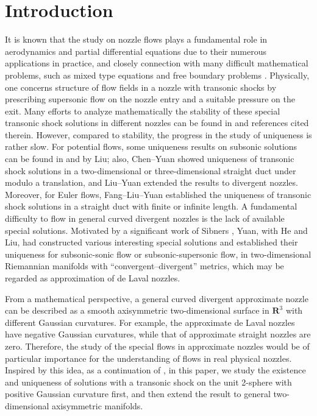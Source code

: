 \documentclass[10pt,a4paper]{amsart}
\numberwithin{equation}{section}
\begin{document}
\section{Introduction}\label{sec1}
It is known that the study on nozzle flows plays a fundamental role in aerodynamics and partial differential equations due to their numerous applications in practice, and closely connection with many difficult mathematical problems, such as mixed type equations and free boundary problems \cite{supshockCF,mixM}. Physically, one concerns structure of flow fields in a nozzle with transonic shocks by prescribing supersonic flow on the nozzle entry and a suitable pressure on the exit. Many efforts to analyze mathematically the stability of these special transonic shock solutions in different nozzles can be found in \cite{tssdivBF,tssCF,eutssdivC,eutssductCY,FGZ,FXeuadmi,GLY,LXY,WXX,XYY} and references cited therein. However, compared to stability, the progress in the study of uniqueness is rather slow. For potential flows, some uniqueness results on subsonic solutions can be found in \cite{Lunisubduct} and \cite{LYunisubdiv} by Liu; also, Chen--Yuan \cite{2009uniductCY} showed uniqueness of transonic shock solutions in a two-dimensional or three-dimensional straight duct under modulo a translation, and Liu--Yuan\cite{unistradivYL} extended the results to divergent nozzles. Moreover, for Euler flows, Fang--Liu--Yuan \cite{FLYunieudiv} established the uniqueness of transonic shock solutions in a straight duct with finite or infinite length. A fundamental difficulty to flow in general curved divergent nozzles is the lack of available special solutions. Motivated by a significant work of Sibners \cite{no1appSS}, Yuan, with He and Liu, had constructed various interesting special solutions \cite{exampleappY} and established their uniqueness \cite{sub2soniappYL,sub2supappYH} for subsonic-sonic flow or subsonic-supersonic flow, in two-dimensional Riemannian manifolds with “convergent–divergent” metrics, which may be regarded as approximation of de Laval nozzles.


From a mathematical perspective, a general curved divergent approximate nozzle can be described as a smooth axisymmetric two-dimensional surface in $\mathbf{R}^3$ with different Gaussian curvatures. For example, the approximate de Laval nozzles have negative Gaussian curvatures, while that of approximate straight nozzles are zero. Therefore, the study of the special flows in approximate nozzles would be of particular importance for the understanding of flows in real physical nozzles. Inspired by this idea, as a continuation of \cite{unistradivYL, LYunisubdiv, sub2soniappYL}, in this paper, we study the existence and uniqueness of solutions with a transonic shock on the unit 2-sphere with positive Gaussian curvature first, and then extend the result to general two-dimensional axisymmetric manifolds. 
\end{document}
